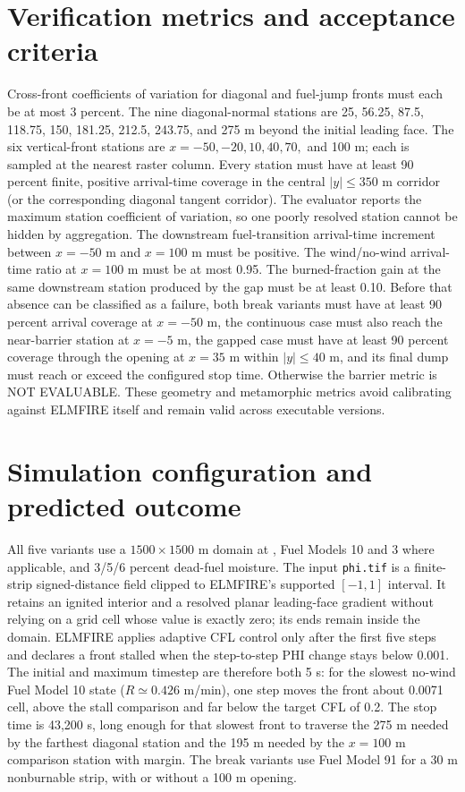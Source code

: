 \section{Verification metrics and acceptance criteria}

Cross-front coefficients of variation for diagonal and fuel-jump fronts must each be at most 3 percent. The nine diagonal-normal stations are 25, 56.25, 87.5, 118.75, 150, 181.25, 212.5, 243.75, and 275 m beyond the initial leading face. The six vertical-front stations are $x=-50,-20,10,40,70,$ and 100 m; each is sampled at the nearest raster column. Every station must have at least 90 percent finite, positive arrival-time coverage in the central $|y|\le350$ m corridor (or the corresponding diagonal tangent corridor). The evaluator reports the maximum station coefficient of variation, so one poorly resolved station cannot be hidden by aggregation. The downstream fuel-transition arrival-time increment between $x=-50$ m and $x=100$ m must be positive. The wind/no-wind arrival-time ratio at $x=100$ m must be at most 0.95. The burned-fraction gain at the same downstream station produced by the gap must be at least 0.10. Before that absence can be classified as a failure, both break variants must have at least 90 percent arrival coverage at $x=-50$ m, the continuous case must also reach the near-barrier station at $x=-5$ m, the gapped case must have at least 90 percent coverage through the opening at $x=35$ m within $|y|\le40$ m, and its final dump must reach or exceed the configured stop time. Otherwise the barrier metric is NOT EVALUABLE. These geometry and metamorphic metrics avoid calibrating against ELMFIRE itself and remain valid across executable versions.

\section{Simulation configuration and predicted outcome}

All five variants use a $1500\times1500$ m domain at \CellSize{}, Fuel Models 10 and 3 where applicable, and 3/5/6 percent dead-fuel moisture. The input \texttt{phi.tif} is a finite-strip signed-distance field clipped to ELMFIRE's supported $[-1,1]$ interval. It retains an ignited interior and a resolved planar leading-face gradient without relying on a grid cell whose value is exactly zero; its ends remain inside the domain. ELMFIRE applies adaptive CFL control only after the first five steps and declares a front stalled when the step-to-step PHI change stays below 0.001. The initial and maximum timestep are therefore both 5 s: for the slowest no-wind Fuel Model 10 state ($R\simeq0.426$ m/min), one step moves the front about 0.0071 cell, above the stall comparison and far below the target CFL of 0.2. The stop time is 43,200 s, long enough for that slowest front to traverse the 275 m needed by the farthest diagonal station and the 195 m needed by the $x=100$ m comparison station with margin. The break variants use Fuel Model 91 for a 30 m nonburnable strip, with or without a 100 m opening.

